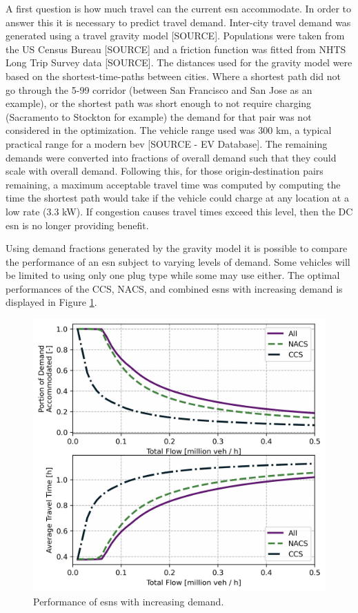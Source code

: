 A first question is how much travel can the current \gls{esn} accommodate. In order to answer this it is necessary to predict travel demand. Inter-city travel demand was generated using a travel gravity model [SOURCE]. Populations were taken from the US Census Bureau [SOURCE] and a friction function was fitted from NHTS Long Trip Survey data [SOURCE]. The distances used for the gravity model were based on the shortest-time-paths between cities. Where a shortest path did not go through the 5-99 corridor (between San Francisco and San Jose as an example), or the shortest path was short enough to not require charging (Sacramento to Stockton for example) the demand for that pair was not considered in the optimization. The vehicle range used was 300 km, a typical practical range for a modern \gls{bev} [SOURCE - EV Database]. The remaining demands were converted into fractions of overall demand such that they could scale with overall demand. Following this, for those origin-destination pairs remaining, a maximum acceptable travel time was computed by computing the time the shortest path would take if the vehicle could charge at any location at a low rate (3.3 kW). If congestion causes travel times exceed this level, then the DC \gls{esn} is no longer providing benefit.

Using demand fractions generated by the gravity model it is possible to compare the performance of an \gls{esn} subject to varying levels of demand. Some vehicles will be limited to using only one plug type while some may use either. The optimal performances of the CCS, NACS, and combined \glspl{esn} with increasing demand is displayed in Figure \ref{fig:esn_performance}.

\begin{figure}[H]
	\centering
	\includegraphics[width = .67\linewidth]{./figures/esn_performance.png}
	\caption{Performance of \glspl{esn} with increasing demand.}
	\label{fig:esn_performance}
\end{figure}

